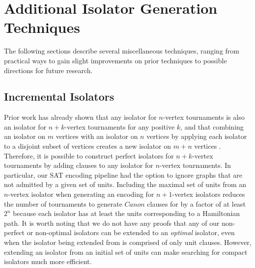 \documentclass[conference]{IEEEtran}
\begin{document}






\section{Additional Isolator Generation Techniques}

The following sections describe several miscellaneous techniques, ranging from practical ways to gain slight improvements on prior techniques to possible directions for future research.

\subsection{Incremental Isolators}
Prior work has already shown that any isolator for $n$-vertex tournaments is also an isolator for $n+k$-vertex tournaments for any positive $k$, and that combining an isolator on $m$ vertices with an isolator on $n$ vertices by applying each isolator to a disjoint subset of vertices creates a new isolator on $m+n$ vertices \cite{ref_incremental}. Therefore, it is possible to construct perfect isolators for $n+k$-vertex tournaments by adding clauses to any isolator for $n$-vertex tournaments. In particular, our SAT encoding pipeline had the option to ignore graphs that are not admitted by a given set of units. Including the maximal set of units from an $n$-vertex isolator when generating an encoding for $n+1$-vertex isolators reduces the number of tournaments to generate $\mathit{Canon}$ clauses for by a factor of at least $2^{n}$ because each isolator has at least the units corresponding to a Hamiltonian path. It is worth noting that we do not have any proofs that any of our non-perfect or non-optimal isolators can be extended to an \textit{optimal} isolator, even when the isolator being extended from is comprised of only unit clauses.  However, extending an isolator from an initial set of units can make searching for compact isolators much more efficient. 
\end{document}
